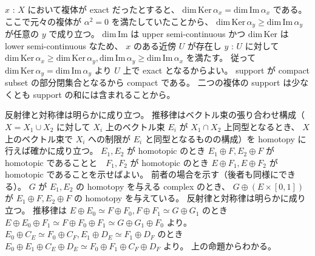 \documentclass[dvipdfmx]{jsarticle}
\begin{document}
\begin{Proof}
\itemprof
  \(x\) : \(X\) において複体が exact だったとすると、 \(\text{dim} \, \text{Ker} \, \alpha_x = \text{dim} \, \text{Im} \, \alpha_x\) である。
  ここで元々の複体が \(\alpha^2 = 0\) を満たしていたことから、 \(\text{dim} \, \text{Ker} \, \alpha_y \geq \text{dim} \, \text{Im} \, \alpha_y\) が任意の \(y\) で成り立つ。
  \(\text{dim} \, \text{Im}\) は upper semi-continuous かつ \(\text{dim} \, \text{Ker}\) は lower semi-continuous なため、 \(x\) のある近傍 \(U\) が存在し \(y\) : \(U\) に対して \(\text{dim} \, \text{Ker} \, \alpha_x \geq \text{dim} \, \text{Ker} \, \alpha_y , \text{dim} \, \text{Im} \, \alpha_y \geq \text{dim} \, \text{Im} \, \alpha_x\) を満たす。
  従って \(\text{dim} \, \text{Ker} \, \alpha_y = \text{dim} \, \text{Im} \, \alpha_y\) より \(U\) 上で exact となるからよい。
\itemprof
  support が compact subset の部分閉集合となるから compact である。
\itemprof
  二つの複体の support は少なくとも support の和には含まれることから。
\end{Proof}

\begin{Proof}
\itemprof
  反射律と対称律は明らかに成り立つ。
  推移律はベクトル束の張り合わせ構成（ \(X = X_1 \cup X_2\) に対して \(X_i\) 上のベクトル束 \(E_i\) が \(X_1 \cap X_2\) 上同型となるとき、 \(X\) 上のベクトル束で \(X_i\) への制限が \(E_i\) と同型となるものの構成）を homotopy に行えば確かに成り立つ。
\itemprof
  \(E_1 , E_2\) が homotopic のとき \(E_1 \oplus F , E_2 \oplus F\) が homotopic であることと　\(F_1 , F_2\) が homotopic のとき \(E \oplus F_1 , E \oplus F_2\) が homotopic であることを示せばよい。
  前者の場合を示す（後者も同様にできる）。
  \(G\) が \(E_1,E_2\) の homotopy を与える complex のとき、 \(G \oplus (E \times [0,1])\) が \(E_1 \oplus F , E_2 \oplus F\) の homotopy を与えている。
\itemprof
  反射律と対称律は明らかに成り立つ。
  推移律は \(E \oplus E_0 \simeq F \oplus F_0 , F \oplus F_1 \simeq G \oplus G_1\) のとき \(E \oplus E_0 \oplus F_1 \simeq F \oplus F_0 \oplus F_1 \simeq G \oplus G_1 \oplus F_0\) より。
\itemprof
  \(E_0 \oplus C_E \simeq F_0 \oplus C_F , E_1 \oplus D_E \simeq F_1 \oplus D_F\) のとき \(E_0 \oplus E_1 \oplus C_E \oplus D_E \simeq F_0 \oplus F_1 \oplus C_F \oplus D_F\) より。
\itemprof
  上の命題からわかる。
\end{Proof}
\end{document}
